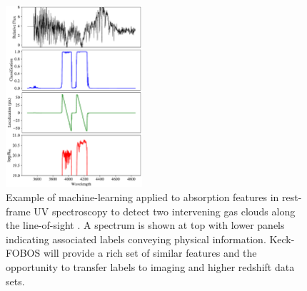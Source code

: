 \documentclass[oneside,11pt]{amsart}
\begin{document}

\begin{figure}\small
%
\includegraphics[width=0.45\textwidth]{figs/Parks18_Fig7_fig_labels.pdf}
%
\caption{Example of machine-learning applied to absorption
features in rest-frame UV spectroscopy to detect two intervening gas
clouds along the line-of-sight \citep[from][]{parks18}.  A spectrum is
shown at top with lower panels indicating associated labels conveying
physical information.  Keck-FOBOS will provide a rich set of similar
features and the opportunity to transfer labels to imaging and higher
redshift data sets.}
%
\label{fig:absorber}
%
\end{figure}
\end{document}
